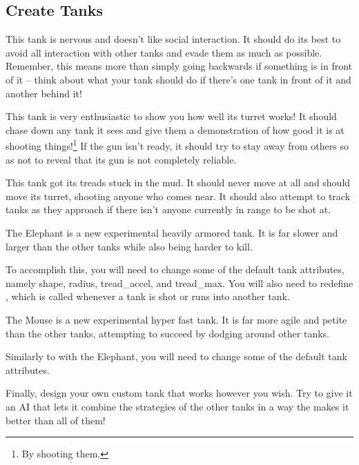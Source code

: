 \documentclass[11pt]{cselabheader}
\begin{document}
\subsection{Create Tanks}
\begin{ex}[coward.py]
This tank is nervous and doesn't like social interaction. It should do its best
to avoid all interaction with other tanks and evade them as much as possible.
Remember, this means more than simply going backwards if something is in front
of it -- think about what your tank should do if there's one tank in front of it
and another behind it!
\end{ex}

\begin{ex}[charger.py]
This tank is very enthusiastic to show you how well its turret works! It should
chase down any tank it sees and give them a demonstration of how good it is at
shooting things!\footnote{By shooting them.} If the gun isn't ready, it should
try to stay away from others so as not to reveal that its gun is not completely
reliable.
\end{ex}

\begin{ex}[turret.py]
This tank got its treads stuck in the mud. It should never move at all and
should move its turret, shooting anyone who comes near. It should also attempt
to track tanks as they approach if there isn't anyone currently in range to be
shot at.
\end{ex}

\begin{ex}[elephant.py]
The Elephant is a new experimental heavily armored tank. It is far slower and
larger than the other tanks while also being harder to kill.

To accomplish this, you will need to change some of the default tank attributes,
namely shape, radius, tread\_accel, and tread\_max. You will also need to
redefine , which is called whenever a tank is shot
or runs into another tank.
\end{ex}

\begin{ex}[mouse.py]
The Mouse is a new experimental hyper fast tank. It is far more agile and
petite than the other tanks, attempting to succeed by dodging around other
tanks.

Similarly to with the Elephant, you will need to change some of the default tank
attributes.
\end{ex}

\begin{ex}[custom.py]
Finally, design your own custom tank that works however you wish. Try to give it
an AI that lets it combine the strategies of the other tanks in a way the makes
it better than all of them!
\end{ex}
\end{document}
